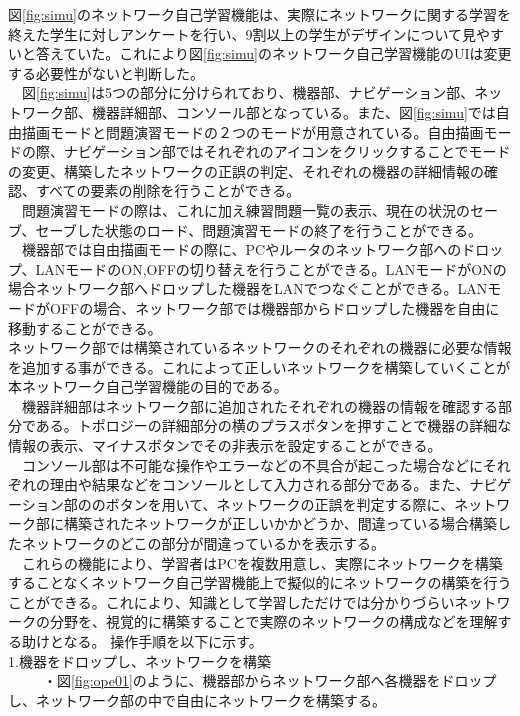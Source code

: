 図\ref{fig:simu}のネットワーク自己学習機能は、実際にネットワークに関する学習を終えた学生に対しアンケートを行い、9割以上の学生がデザインについて見やすいと答えていた。これにより図\ref{fig:simu}のネットワーク自己学習機能のUIは変更する必要性がないと判断した。\\
　図\ref{fig:simu}は5つの部分に分けられており、機器部、ナビゲーション部、ネットワーク部、機器詳細部、コンソール部となっている。また、図\ref{fig:simu}では自由描画モードと問題演習モードの２つのモードが用意されている。自由描画モードの際、ナビゲーション部ではそれぞれのアイコンをクリックすることでモードの変更、構築したネットワークの正誤の判定、それぞれの機器の詳細情報の確認、すべての要素の削除を行うことができる。\\
　問題演習モードの際は、これに加え練習問題一覧の表示、現在の状況のセーブ、セーブした状態のロード、問題演習モードの終了を行うことができる。\\
　機器部では自由描画モードの際に、PCやルータのネットワーク部へのドロップ、LANモードのON,OFFの切り替えを行うことができる。LANモードがONの場合ネットワーク部へドロップした機器をLANでつなぐことができる。LANモードがOFFの場合、ネットワーク部では機器部からドロップした機器を自由に移動することができる。\\
ネットワーク部では構築されているネットワークのそれぞれの機器に必要な情報を追加する事ができる。これによって正しいネットワークを構築していくことが本ネットワーク自己学習機能の目的である。\\
　機器詳細部はネットワーク部に追加されたそれぞれの機器の情報を確認する部分である。トポロジーの詳細部分の横のプラスボタンを押すことで機器の詳細な情報の表示、マイナスボタンでその非表示を設定することができる。\\
　コンソール部は不可能な操作やエラーなどの不具合が起こった場合などにそれぞれの理由や結果などをコンソールとして入力される部分である。また、ナビゲーション部ののボタンを用いて、ネットワークの正誤を判定する際に、ネットワーク部に構築されたネットワークが正しいかかどうか、間違っている場合構築したネットワークのどこの部分が間違っているかを表示する。\\
　これらの機能により、学習者はPCを複数用意し、実際にネットワークを構築することなくネットワーク自己学習機能上で擬似的にネットワークの構築を行うことができる。これにより、知識として学習しただけでは分かりづらいネットワークの分野を、視覚的に構築することで実際のネットワークの構成などを理解する助けとなる。
操作手順を以下に示す。\\
1.機器をドロップし、ネットワークを構築\\
~~~~~・図\ref{fig:ope01}のように、機器部からネットワーク部へ各機器をドロップし、ネットワーク部の中で自由にネットワークを構築する。\\
